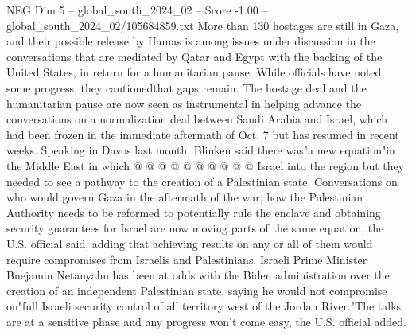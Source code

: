 \begin{textsample}{NEG Dim 5 – global\_south\_2024\_02 – Score -1.00 – global\_south\_2024\_02/105684859.txt}
More than 130 hostages are still in Gaza, and their possible release by Hamas is among issues under discussion in the conversations that are mediated by Qatar and Egypt with the backing of the United States, in return for a humanitarian pause.
While officials have noted some progress, they cautionedthat gaps remain.
The hostage deal and the humanitarian pause are now seen as instrumental in helping advance the conversations on a normalization deal between Saudi Arabia and Israel, which had been frozen in the immediate aftermath of Oct. 7 but has resumed in recent weeks.
Speaking in Davos last month, Blinken said there was"a new equation"in the Middle East in which @ @ @ @ @ @ @ @ @ @ Israel into the region but they needed to see a pathway to the creation of a Palestinian state.
Conversations on who would govern Gaza in the aftermath of the war, how the Palestinian Authority needs to be reformed to potentially rule the enclave and obtaining security guarantees for Israel are now moving parts of the same equation, the U.S. official said, adding that achieving results on any or all of them would require compromises from Israelis and Palestinians.
Israeli Prime Minister Bnejamin Netanyahu has been at odds with the Biden administration over the creation of an independent Palestinian state, saying he would not compromise on"full Israeli security control of all territory west of the Jordan River."The talks are at a sensitive phase and any progress won't come easy, the U.S. official added.

\end{textsample}
